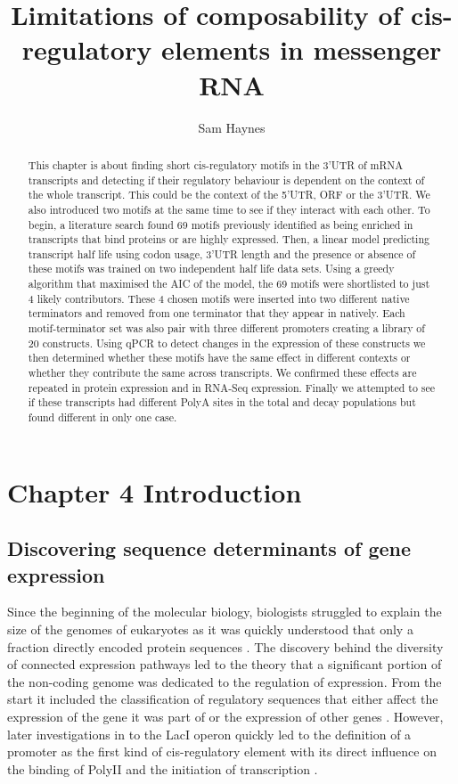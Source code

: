 \documentclass{SBCbookchapter}
\author{Sam Haynes}
\title{{Limitations} of composability of cis-regulatory elements in messenger RNA}
\begin{document}
\maketitle

\begin{abstract}
This chapter is about finding short cis-regulatory motifs in the 3'UTR of mRNA transcripts and detecting if their regulatory behaviour is dependent on the context of the whole transcript. This could be the context of the 5'UTR, ORF or the 3'UTR. We also introduced two motifs at the same time to see if they interact with each other. To begin, a literature search found 69 motifs previously identified as being enriched in transcripts that bind proteins or are highly expressed. Then, a linear model predicting transcript half life using codon usage, 3'UTR length and the presence or absence of these motifs was trained on two independent half life data sets. Using a greedy algorithm that maximised the AIC of the model, the 69 motifs were shortlisted to just 4 likely contributors. These 4 chosen motifs were inserted into two different native terminators and removed from one terminator that they appear in natively. Each motif-terminator set was also pair with three different promoters creating a library of 20 constructs. Using qPCR to detect changes in the expression of these constructs we then determined whether these motifs have the same effect in different contexts or whether they contribute the same across transcripts. We confirmed these effects are repeated in protein expression and in RNA-Seq expression. Finally we attempted to see if these transcripts had different PolyA sites in the total and decay populations but found different in only one case.
\end{abstract}

\section{Chapter 4 Introduction}

\subsection{Discovering sequence determinants of gene expression}

Since the beginning of the molecular biology, biologists struggled to explain the size of the genomes of eukaryotes as it was quickly understood that only a fraction directly encoded protein sequences \cite{Thomas1971,MIRSKY1951}. 
The discovery behind the diversity of connected expression pathways led to the theory that a significant portion of the non-coding genome was dedicated to the regulation of expression. 
From the start it included the classification of regulatory sequences that either affect the expression of the gene it was part of or the expression of other genes \cite{Britten1969}. 
However, later investigations in to the LacI operon quickly led to the definition of a promoter as the first kind of cis-regulatory element with its direct influence on the binding of PolyII and the initiation of transcription \cite{JACOB1964}. 
\end{document}
